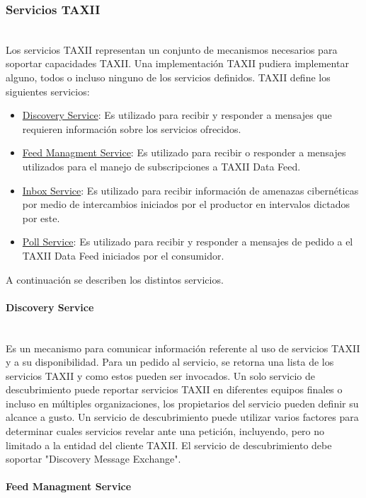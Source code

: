 \subsubsection{Servicios TAXII}\ \\

Los servicios TAXII representan un conjunto de mecanismos necesarios para 
soportar capacidades TAXII. Una implementación TAXII pudiera implementar alguno, 
todos o incluso ninguno de los servicios definidos.
TAXII define los siguientes servicios:
\begin{itemize}
  \item \underline{Discovery Service}: Es utilizado para recibir y responder a 
  mensajes que requieren información sobre los servicios ofrecidos.
  \item \underline{Feed Managment Service}: Es utilizado para recibir o responder a mensajes 
  utilizados para el manejo de subscripciones a TAXII Data Feed.
  \item \underline{Inbox Service}: Es utilizado para recibir información de amenazas 
  cibernéticas por medio de intercambios iniciados por el productor en intervalos 
  dictados por este.
  \item \underline{Poll Service}: Es utilizado para recibir y responder a mensajes de pedido 
  a el TAXII Data Feed iniciados por el consumidor.
\end{itemize}

A continuación se describen los distintos servicios.

\paragraph{Discovery Service}\ \\

Es un mecanismo para comunicar información referente al uso de servicios TAXII y 
a su disponibilidad. Para un pedido al servicio, se retorna una lista de los 
servicios TAXII y como estos pueden ser invocados. Un solo servicio de 
descubrimiento puede reportar servicios TAXII en diferentes equipos finales o 
incluso en múltiples organizaciones, los propietarios del servicio pueden 
definir su alcance a gusto. Un servicio de descubrimiento puede utilizar 
varios factores para determinar cuales servicios revelar ante una petición, 
incluyendo, pero no limitado a la entidad del cliente TAXII.
El servicio de descubrimiento debe soportar "Discovery Message Exchange".

\paragraph{Feed Managment Service}\ \\

